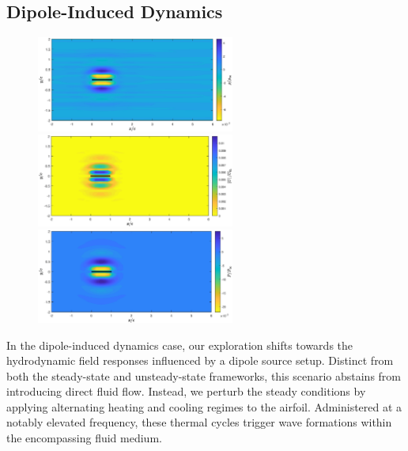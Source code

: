 \subsection{Dipole-Induced Dynamics}
\begin{figure}
\caption{}
    \includegraphics[width=0.58\textwidth]{drawings/U0_epsT.1_omegaT15_density.eps}
    \vspace{0.07cm}
    \includegraphics[width=0.58\textwidth]{drawings/U0_epsT.1_omegaT15_velocity.eps}
    \vspace{0.07cm}
    \includegraphics[width=0.58\textwidth]{drawings/U0_epsT.1_omegaT15_pressure.eps}
    \vspace{0.07cm}
    \begin{minipage}{0.58\textwidth}
    \end{minipage}
    \label{fig:dipole}
\end{figure}
In the dipole-induced dynamics case, our exploration shifts towards the hydrodynamic field responses influenced by a dipole source setup. Distinct from both the steady-state and unsteady-state frameworks, this scenario abstains from introducing direct fluid flow. Instead, we perturb the steady conditions by applying alternating heating and cooling regimes to the airfoil. Administered at a notably elevated frequency, these thermal cycles trigger wave formations within the encompassing fluid medium.

